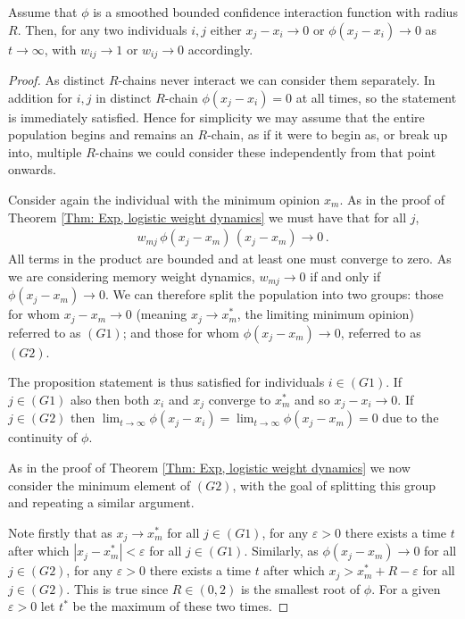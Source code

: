 \documentclass{article}
\begin{document}
\begin{proposition} \label{Prop: BC, memory weight dynamics}
    Assume that $\phi$ is a smoothed bounded confidence interaction function with radius $R$. Then, for any two individuals $i,j$ either $x_j - x_i \rightarrow 0$ or $\phi(x_j - x_i)\rightarrow 0$ as $t\rightarrow \infty$, with $w_{ij}\rightarrow1$ or $w_{ij}\rightarrow0$ accordingly. 
\end{proposition}
\begin{proof}
    As distinct $R$-chains never interact we can consider them separately. In addition for $i,j$ in distinct $R$-chain $\phi(x_j - x_i)=0$ at all times, so the statement is immediately satisfied. Hence for simplicity we may assume that the entire population begins and remains an $R$-chain, as if it were to begin as, or break up into, multiple $R$-chains we could consider these independently from that point onwards. 
   
    Consider again the individual with the minimum opinion $x_m$. As in the proof of Theorem \ref{Thm: Exp, logistic weight dynamics} we must have that for all $j$, 
    \begin{align*}
        w_{mj}\,\phi(x_j - x_m)\,(x_j - x_m) \rightarrow 0 \,.
    \end{align*}
    All terms in the product are bounded and at least one must converge to zero. As we are considering memory weight dynamics, $w_{mj}\rightarrow0$ if and only if $\phi(x_j - x_m) \rightarrow 0$. We can therefore split the population into two groups: those for whom $x_j - x_m \rightarrow 0$ (meaning $x_j \rightarrow x_m^*$, the limiting minimum opinion) referred to as $(G1)$; and those for whom $\phi(x_j - x_m)\rightarrow 0$, referred to as $(G2)$. 

    The proposition statement is thus satisfied for individuals $i \in (G1)$. If $j\in(G1)$ also then both $x_i$ and $x_j$ converge to $x_m^*$ and so $x_j-x_i\rightarrow0$. If $j\in(G2)$ then $\lim_{t\rightarrow\infty}\phi(x_j - x_i) = \lim_{t\rightarrow\infty}\phi(x_j - x_m) = 0$ due to the continuity of $\phi$. 

    As in the proof of Theorem \ref{Thm: Exp, logistic weight dynamics} we now consider the minimum element of $(G2)$, with the goal of splitting this group and repeating a similar argument. 

    Note firstly that as $x_j \rightarrow x_m^*$ for all $j\in(G1)$, for any $\varepsilon>0$ there exists a time $t$ after which $|x_j - x_m^*|<\varepsilon$ for all $j\in(G1)$. Similarly, as $\phi(x_j-x_m)\rightarrow0$ for all $j \in (G2)$, for any $\varepsilon>0$ there exists a time $t$ after which $x_j > x_m^* + R - \varepsilon$ for all $j\in(G2)$. This is true since $R\in(0,2)$ is the smallest root of $\phi$. For a given $\varepsilon>0$ let $t^*$ be the maximum of these two times. 
    

\end{proof}
\end{document}
